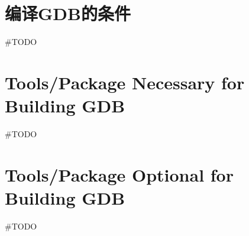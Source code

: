 \section{编译GDB的条件}

\#TODO

\section*{Tools/Package Necessary for Building GDB}
\#TODO

\section*{Tools/Package Optional for Building GDB}
\#TODO
